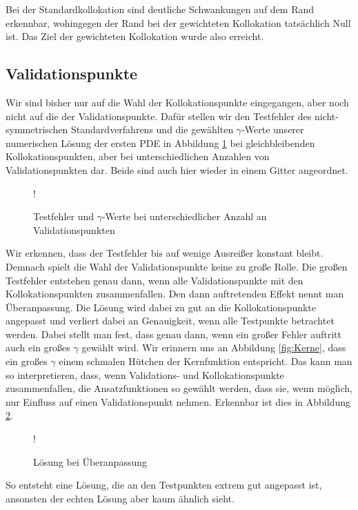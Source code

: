 Bei der Standardkollokation sind deutliche Schwankungen auf dem Rand erkennbar, wohingegen der Rand bei der gewichteten Kollokation tatsächlich Null ist. Das Ziel der gewichteten Kollokation wurde also erreicht.

\subsection{Validationspunkte}
Wir sind bisher nur auf die Wahl der Kollokationspunkte eingegangen, aber noch nicht auf die der Validationspunkte. Dafür stellen wir den Testfehler des nicht-symmetrischen Standardverfahrens und die gewählten $\gamma$-Werte unserer numerischen Lösung der ersten \ac{PDE} in Abbildung \ref{fig:testpunkte} bei gleichbleibenden Kollokationspunkten, aber bei unterschiedlichen Anzahlen von Validationspunkten dar. Beide sind auch hier wieder in einem Gitter angeordnet.
\begin{figure}[ht]
\centering
\resizebox {\columnwidth} {!} {

}
\caption{Testfehler und $\gamma$-Werte bei unterschiedlicher Anzahl an Validationspunkten}
\label{fig:testpunkte}
\end{figure}
Wir erkennen, dass der Testfehler bis auf wenige Ausreißer konstant bleibt. Demnach spielt die Wahl der Validationspunkte keine zu große Rolle. Die großen Testfehler entstehen genau dann, wenn alle Validationspunkte mit den Kollokationspunkten zusammenfallen. Den dann auftretenden Effekt nennt man Überanpassung. Die Lösung wird dabei zu gut an die Kollokationspunkte angepasst und verliert dabei an Genauigkeit, wenn alle Testpunkte betrachtet werden. Dabei stellt man fest, dass genau dann, wenn ein großer Fehler auftritt auch ein großes $\gamma$ gewählt wird. Wir erinnern uns an Abbildung \ref{fig:Kerne}, dass ein großes $\gamma$ einem schmalen \glqq Hütchen\grqq{}  der Kernfunktion entspricht. Das kann man so interpretieren, dass, wenn Validations- und Kollokationspunkte zusammenfallen, die Ansatzfunktionen so gewählt werden, dass sie, wenn möglich, nur \glqq Einfluss \grqq{} auf einen Validationspunkt nehmen. Erkennbar ist dies in Abbildung \ref{fig:overfitting}.
\begin{figure}[ht]
\centering
\resizebox {\columnwidth} {!} {

}
\caption{Lösung bei Überanpassung}
\label{fig:overfitting}
\end{figure}
So entsteht eine Lösung, die an den Testpunkten extrem gut angepasst ist, ansonsten der echten Lösung aber kaum ähnlich sieht.

